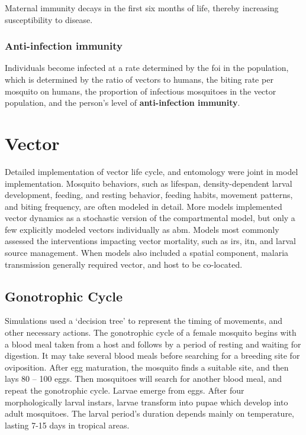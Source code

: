 \documentclass[a4paper, 12pt, twoside]{report}
\begin{document}
Maternal immunity decays in the first six months of life, thereby increasing susceptibility to disease.

\subsubsection{Anti-infection immunity}
Individuals become infected at a rate determined by the \gls{foi} in the population, which is determined by the ratio of vectors to humans, the biting rate per mosquito on humans, the proportion of infectious mosquitoes in the vector population, and the person’s level of \textbf{anti-infection immunity}.


\section{Vector}%
\label{sec:vector}
Detailed implementation of vector life cycle, and entomology were joint in model implementation.
Mosquito behaviors, such as lifespan, density-dependent larval development, feeding, and resting behavior, feeding habits, movement patterns, and biting frequency, are often modeled in detail.
More models implemented vector dynamics as a stochastic version of the compartmental model\cite{Sherrard-Smith2018b}, but only a few explicitly modeled vectors individually as \gls{abm}. 
Models most commonly assessed the interventions impacting vector mortality, such as \gls{irs}, \gls{itn}, and larval source management.
When models also included a spatial component, malaria transmission generally required vector, and host to be co-located.

\subsection{Gonotrophic Cycle}
Simulations used a ‘decision tree’ to represent the timing of movements, and other necessary actions.
The gonotrophic cycle of a female mosquito begins with a blood meal taken from a host and follows by a period of resting and waiting for digestion.
It may take several blood meals before searching for a breeding site for oviposition.
After egg maturation, the mosquito finds a suitable site, and then lays 80 – 100 eggs.
Then mosquitoes will search for another blood meal, and repeat the gonotrophic cycle.
Larvae emerge from eggs.
After four morphologically larval instars, larvae transform into pupae which develop into adult mosquitoes.
The larval period's duration depends mainly on temperature, lasting 7-15 days in tropical areas.
\end{document}
